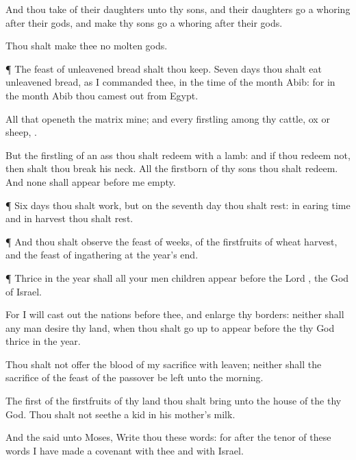 {And thou
take of their
daughters unto thy
sons, and their
daughters go a
whoring
after their
gods, and
make thy
sons go a
whoring
after their
gods.

Thou shalt
make thee no
molten
gods.


\par }{\PP {}¶ The
feast of unleavened
bread shalt thou
keep.
Seven
days thou shalt
eat unleavened
bread, as I
commanded thee, in the
time of the
month
Abib: for in the
month
Abib thou camest
out from
Egypt.

All that
openeth the
matrix
{} mine; and every
firstling among thy
cattle,
{}
ox or
sheep,
{}.

But the
firstling of an
ass thou shalt
redeem with a
lamb: and if thou
redeem
{} not, then shalt thou break his
neck. All the
firstborn of thy
sons thou shalt
redeem. And none shall
appear
before me
empty.


\par }{\PP {}¶
Six
days thou shalt
work, but on the
seventh
day thou shalt
rest: in earing
time and in
harvest thou shalt
rest.


\par }{\PP {}¶ And thou shalt
observe the
feast of
weeks, of the
firstfruits of
wheat
harvest, and the
feast of
ingathering at the
year’s
end.


\par }{\PP {}¶
Thrice in the
year shall all your men
children
appear
before the
Lord
{}, the
God of
Israel.

For I will cast
out the
nations
before thee, and
enlarge thy
borders: neither shall any
man
desire thy
land, when thou shalt go
up to
appear
before the
{} thy
God
thrice in the
year.

Thou shalt not
offer the
blood of my
sacrifice with
leaven; neither shall the
sacrifice of the
feast of the
passover be
left unto the
morning.

The
first of the
firstfruits of thy
land thou shalt
bring unto the
house of the
{} thy
God. Thou shalt not
seethe a
kid in his
mother’s
milk.

And the
{}
said unto
Moses,
Write thou these
words: for after the
tenor of these
words I have
made a
covenant with thee and with
Israel.


}
